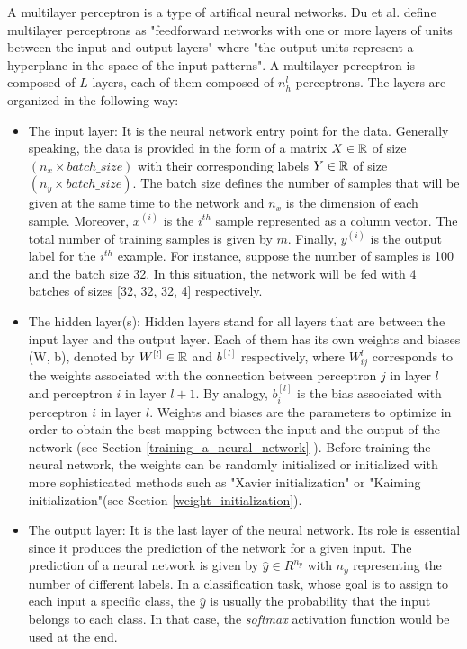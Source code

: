 \setlength{\marginparwidth}{3cm}\leavevmode {}A multilayer perceptron is a type of artifical neural networks. Du et al. \cite{23} define multilayer perceptrons as "feedforward networks with one or more layers of units between the
input and output layers" where "the output units represent a hyperplane in the space
of the input patterns". A multilayer perceptron is composed of $L$ layers, each of them composed of $n^{l}_{h}$ perceptrons. The layers are organized in the following way:
\begin{itemize}
\item The input layer: It is the neural network entry point for the data. Generally speaking, the data is provided in the form of a matrix $X \in \mathbb{R}$ of size $(n_{x} \times batch\_size)$ with their corresponding labels $Y \in \mathbb{R}$ of size $(n_{y} \times batch\_size)$. The batch size defines the number of samples that will be given at the same time to the network and $n_{x}$ is the dimension of each sample. Moreover, $x^{(i)}$ is the $i^{th}$ sample represented as a column vector. The total number of training samples is given by $m$. Finally, $y^{(i)}$ is the output label for the $i^{th}$ example. For instance, suppose the number of samples is 100 and the batch size 32. In this situation, the network will be fed with 4 batches of sizes [32, 32, 32, 4] respectively. 

\item The hidden layer(s): Hidden layers stand for all layers that are between the input layer and the output layer. Each of them has its own weights and biases (W, b), denoted by $W^{[l]} \in \mathbb{R} $ and $b^{[l]}$ respectively, where $W_{ij}^{l}$ corresponds to the weights associated with the connection between perceptron $j$ in layer $l$ and perceptron $i$ in layer $l+1$. By analogy, $b_{i}^{[l]}$ is the bias associated with perceptron $i$ in layer $l$. Weights and biases are the parameters to optimize in order to obtain the best mapping between the input and the output of the network (see Section \ref{training_a_neural_network} ). Before training the neural network, the weights can be randomly initialized or initialized with more sophisticated methods such as "Xavier initialization" or "Kaiming initialization"(see Section \ref{weight_initialization}).

\item The output layer: It is the last layer of the neural network. Its role is essential since it produces the prediction of the network for a given input. The prediction of a neural network is given by $\hat{y} \in R^{n_{y}}$ with $n_{y}$ representing the number of different labels. In a classification task, whose goal is to assign to each input a specific class, the $\hat{y}$ is usually the probability that the input belongs to each class. In that case, the \textit{softmax} activation function would be used at the end.
\end{itemize}
